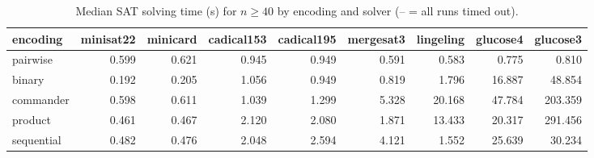 \begin{table}[t]
\centering
\caption{Median SAT solving time (s) for $n \geq 40$ by encoding and solver (-- = all runs timed out).}
\label{tab:enc_solver}
\begin{tabular}{lrrrrrrrr}
\toprule
encoding & minisat22 & minicard & cadical153 & cadical195 & mergesat3 & lingeling & glucose4 & glucose3 \\
\midrule
pairwise & 0.599 & 0.621 & 0.945 & 0.949 & 0.591 & 0.583 & 0.775 & 0.810 \\
binary & 0.192 & 0.205 & 1.056 & 0.949 & 0.819 & 1.796 & 16.887 & 48.854 \\
commander & 0.598 & 0.611 & 1.039 & 1.299 & 5.328 & 20.168 & 47.784 & 203.359 \\
product & 0.461 & 0.467 & 2.120 & 2.080 & 1.871 & 13.433 & 20.317 & 291.456 \\
sequential & 0.482 & 0.476 & 2.048 & 2.594 & 4.121 & 1.552 & 25.639 & 30.234 \\
\bottomrule
\end{tabular}
\end{table}
